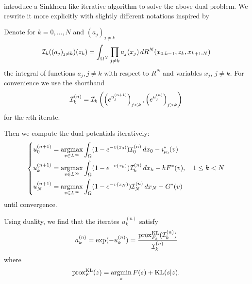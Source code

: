 \documentclass[../report.tex]{subfiles}
\begin{document}
\textcite{benamou2018entropy} introduce a Sinkhorn-like iterative algorithm to solve the above dual problem. We rewrite it more explicitly with slightly different notations inspired by \cite{chizat2016scaling}
\begin{thmalgo}\label{algo:Algo1}
	Denote for $k=0,\ldots,N$ and $(a_j)_{j\neq k}$
	\[
	\mathcal{I}_k((a_j)_{j\neq k})(z_k) = 
	\int_{\Omega^N} \prod_{j\neq k} a_j(x_j)\,
	dR^N(x_{0:k-1}, z_k, x_{k+1:N})
	\]
	the integral of functions $a_j,j\neq k$ with respect to $R^N$ and variables $x_j$, $j\neq k$.
	For convenience we use the shorthand
	\[
	\mathcal{I}_k^{(n)} = \mathcal{I}_k\left(\left(e^{u^{(n+1)}_j}\right)_{j<k}, \left(e^{u^{(n)}_j}\right)_{j>k}\right)
	\]
	for the $n$th iterate.
	
	Then we compute the dual potentials iteratively:
	\begin{equation}
	\begin{dcases}
	u_0^{(n+1)} = \operatorname*{argmax}_{v \in L^\infty} \int_{\Omega} (1 - e^{-v(x_0)}) \mathcal{I}_0^{(n)} \,dx_0 - \imath_{\rho_0}^*(v) \\
	u_k^{(n+1)} = \operatorname*{argmax}_{v \in L^\infty} \int_{\Omega} (1- e^{-v(x_k)}) \mathcal{I}_k^{(n)} \,dx_k - hF^*(v) ,
	\quad 1\leq k < N  \\
	u_N^{(n+1)} = \operatorname*{argmax}_{v \in L^\infty} \int_{\Omega} (1 - e^{-v(x_N)}) \mathcal{I}_N^{(n)} \,dx_N - G^*(v)
	\end{dcases}
	\end{equation}
	until convergence.
	
	Using duality, we find that the iterates $u_k^{(n)}$ satisfy
	\begin{equation}
	a_k^{(n)} = \exp(-u^{(n)}_k) =
	\frac{
		\operatorname{prox}_{F_k}^{\operatorname{KL}}(\mathcal{I}_k^{(n)})
	}{
		\mathcal{I}_k^{(n)}
	}
	\end{equation}
	where
	\[
	\operatorname{prox}_F^{\operatorname{KL}}(z) = \operatorname*{argmin}_{s} F(s) + \operatorname{KL}(s|z).
	\]
\end{thmalgo}
\end{document}
